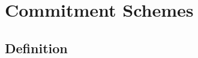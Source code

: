 \chapter{Commitment Schemes}
\label{ch:commitment}

\section{Definition}
\label{sec:commitment:definition}



